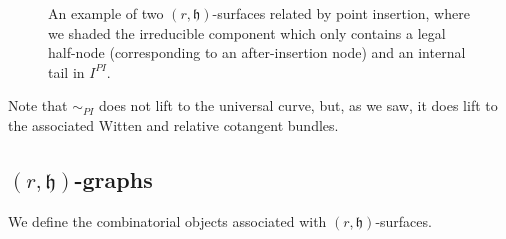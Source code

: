 \documentclass[11pt,a4paper]{article}
\theoremstyle{definition}
\theoremstyle{remark}
\numberwithin{equation}{section}
\def\h{{\mathfrak h}}
\begin{document}
\begin{figure}[h]
\begin{subfigure}{.45\textwidth}
\end{subfigure}

        \caption{An example of two $(r,\h)$-surfaces related by point insertion, where we shaded the irreducible component which only contains a legal half-node (corresponding to an after-insertion node) and an internal tail in $I^{PI}$. }
        \label{fig rh surface}
    \end{figure}

Note that $\sim_{PI}$ does not lift to the universal curve, but, as we saw, it does lift to the associated Witten and relative cotangent bundles.
\subsection{$(r,\h)$-graphs}

 We define the combinatorial objects associated with $(r,\h)$-surfaces.
\end{document}
